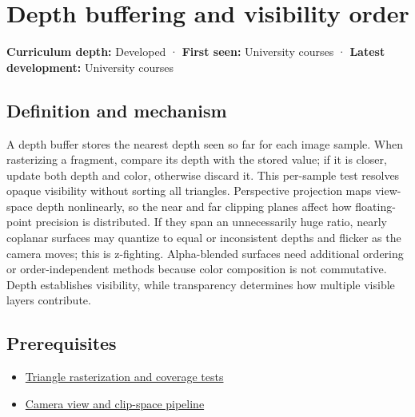 \hypertarget{appendix-97578ed97952}{}\label{referencestart:appendix-97578ed97952}
\section{Depth buffering and visibility order}\label{appendix-97578ed97952-depth-buffering-and-visibility-order}

\hypertarget{appendix-97578ed97952-depth-buffering-and-visibility-order}{}

\textbf{Curriculum depth:} Developed · \textbf{First seen:} University courses · \textbf{Latest development:} University courses

\begin{allmightroledefinition}

\subsection{Definition and mechanism}\label{appendix-97578ed97952-definition-and-mechanism}

\hypertarget{appendix-97578ed97952-definition-and-mechanism}{}

A depth buffer stores the nearest depth seen so far for each image sample. When rasterizing a fragment, compare its depth with the stored value; if it is closer, update both depth and color, otherwise discard it. This per-sample test resolves opaque visibility without sorting all triangles. Perspective projection maps view-space depth nonlinearly, so the near and far clipping planes affect how floating-point precision is distributed. If they span an unnecessarily huge ratio, nearly coplanar surfaces may quantize to equal or inconsistent depths and flicker as the camera moves; this is z-fighting. Alpha-blended surfaces need additional ordering or order-independent methods because color composition is not commutative. Depth establishes visibility, while transparency determines how multiple visible layers contribute.

\end{allmightroledefinition}

\subsection{Prerequisites}\label{appendix-97578ed97952-prerequisites}

\hypertarget{appendix-97578ed97952-prerequisites}{}

\begin{itemize}
\tightlist
\item
  \hyperref[appendix-ed3f9bc298fe]{Triangle rasterization and coverage tests}
\item
  \hyperref[appendix-1c07d64f5e70]{Camera view and clip-space pipeline}
\end{itemize}

